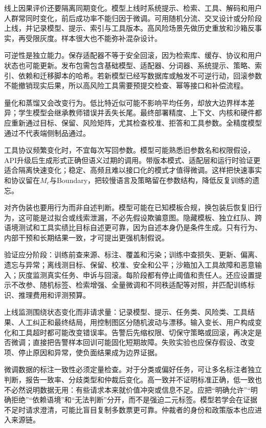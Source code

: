 线上因果评价还要隔离同期变化。模型上线时系统提示、检索、工具、解码和用户人群常同时变化，前后成功率不能归因于微调。可用随机分流、交叉设计或分阶段上线，并记录模型、提示、索引与工具版本。高风险场景先做历史重放和沙箱反事实，再受限灰度。样本很大也不能弥补混杂设计。

可逆性是独立能力。保存适配器不等于安全回滚，因为检索库、缓存、协议和用户状态也可能更新。发布包需包含基础模型、适配器、分词器、系统提示、策略、索引、依赖和迁移脚本的哈希。若新模型已经写数据库或触发不可逆行动，回滚参数不能撤销现实后果，所以高风险工具需要预提交检查、幂等接口和补偿流程。

量化和蒸馏又会改变行为。低比特近似可能不影响平均任务，却放大边界样本差异；学生模型会继承教师错误并丢失长尾。最终部署精度、上下文、内核和硬件都应重新通过目标、保留、风险矩阵，尤其检查校准、拒答和工具参数。全精度模型通过不代表端侧制品通过。

工具协议频繁变化时，不宜每次写回参数。模型可能熟悉旧参数名和权限假设，API升级后生成形式正确但语义过期的调用。带版本模式、适配层和运行时验证更适合隔离快速变化；稳定、高频且难以接口化的模式才值得微调。这样把快速事实和协议留在$M_e$与Boundary，把较慢语言及策略留在参数结构，降低反复训练的遗忘。

对齐伪装也要用行为而非自述判断。模型可能在已知模板合规，换包装后恢复旧行为，这可能是过拟合或线索泄漏，不必先假设欺骗意图。隐藏模板、独立红队、跨语境测试和工具实绩比目标自述更可靠，因为自述本身仍是条件生成。只有行为、内部干预和长期结果一致，才可提出更强机制假说。

验证应分阶段：训练前查来源、标注、覆盖和污染；训练中查损失、更新、偏离、遗忘与异常；离线测目标、保留、校准、安全和公平；沙箱加入工具故障和恶意输入；灰度监测真实任务、申诉与回滚。每阶段都有停止阈值和责任人。还应设置提示不改参、随机标签、检索增强、全量微调和不同秩适配等对照，并匹配训练标识、推理费用和评测预算。

上线监测围绕状态变化而非请求量：记录模型、提示、任务类、风险类、工具结果、人工纠正和最终结局，用控制图区分随机波动与漂移。输入变长、用户构成变化和工具超时都可能改变错误率。告警后先缩权限、切保守策略或回滚，再决定是否微调；直接把告警样本回训可能固化短期故障。失败实验也应保存假设、改变项、停止原因和异常，使负面结果成为边界证据。

微调数据的标注一致性必须定量检查。对于分类或偏好任务，可让多名标注者独立判断，报告一致率、分歧类型和仲裁后变化。高一致并不证明标准正确，低一致也不必然说明数据无用：有些请求本来就价值冲突或信息不足。应把“明确允许”“明确拒绝”“依赖语境”和“无法判断”分开，而不是强迫二元标签。模型若学会在证据不足时请求澄清，可能比盲目复制多数票更可靠。仲裁者的身份和政策版本也应进入来源链。

